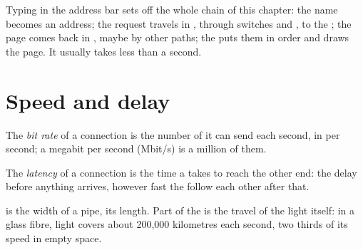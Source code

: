 Typing  in the address bar sets off the whole
chain of this chapter: the name becomes an address; the request travels in
, through switches and , to the ; the page comes back in
, maybe by other paths; the  puts them in order and draws the
page. It usually takes less than a second.

\section{Speed and delay}

\begin{definition}\label{def:g8:how-the-internet-works:bit-rate}
The \emph{bit rate} of a connection is the number of  it
can send each second, in  per second; a megabit per second (Mbit/s) is a
million of them.
\end{definition}

\begin{definition}[Latency]\label{def:g8:how-the-internet-works:latency}
The \emph{latency} of a connection is the time a  takes to
reach the other end: the delay before anything arrives, however fast the
 follow each other after that.
\end{definition}

 is the width of a pipe,  its length. Part of the  is
the travel of the light itself: in a glass fibre, light covers about 200,000
kilometres each second, two thirds of its speed in empty space.

\label{lst:g8:how-the-internet-works:delay}

\label{out:g8:how-the-internet-works:delay}

